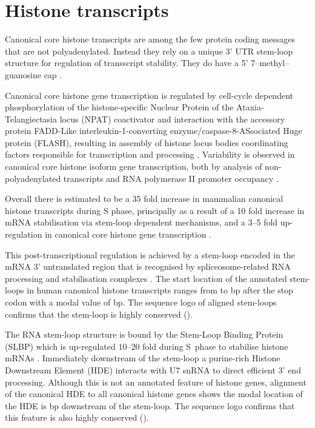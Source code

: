 \section{Histone transcripts}

  Canonical core histone transcripts are among the few protein coding messages that are not polyadenylated.
  Instead they rely on a unique 3' UTR stem-loop structure
  for regulation of transscript stability.
  They do have a 5' 7--methyl--guanosine cap \citep{MarzluffNatRevGen2008}.

  Canonical core histone gene transcription is regulated
  by cell-cycle dependent phosphorylation of the histone-specific
  Nuclear Protein of the Ataxia-Telangiectasia locus (NPAT) coactivator
  and interaction with the accessory protein
  FADD-Like interleukin-1\textbeta{}-converting
  enzyme/caspase-8-ASsociated Huge protein (FLASH),
  resulting in assembly of histone locus bodies
  coordinating factors responsible for transcription and processing
  \citep{MarzluffNatRevGen2008,RattrayMueller2012,Hoefig2014}.
  Variability is observed in canonical core histone isoform gene transcription,
  both by analysis of non-polyadenylated transcripts \citep{YangGenomeBiol2011}
  and RNA polymerase II promoter occupancy \citep{Ederveen2011}.

  Overall there is estimated to be a 35 fold increase in mammalian
  canonical histone transcripts during S phase,
  principally as a result of a 10 fold increase in mRNA stabilisation
  via stem-loop dependent mechanisms,
  and a 3--5 fold up-regulation in canonical core histone gene transcription \citep{HarrisMCB1991}.

  This post-transcriptional regulation is achieved by
  a stem-loop encoded in the mRNA 3' untranslated region
  that is recognised by spliceosome-related RNA
  processing and stabilisation complexes \citep{stem-loop-structure}.
  The start location of the annotated stem-loops in human canonical histone transcripts
  ranges from \StemLoopStartMin{} to \StemLoopStartMax{} bp after the stop codon
  with a modal value of \StemLoopStartMode{} bp.
  The sequence logo of aligned stem-loops confirms that the stem-loop is
  highly conserved ().

  The RNA stem-loop structure is bound by the Stem-Loop Binding Protein (SLBP)
  which is up-regulated 10--20 fold during S~phase to stabilise
  histone mRNAs \citep{SLBP-regulation}.
  Immediately downstream of the stem-loop a purine-rich Histone Downstream Element (HDE)
  interacts with U7 snRNA to direct efficient 3' end processing.
  Although this is not an annotated feature of histone genes,
  alignment of the canonical HDE \citep{HDE-sequence} to all canonical histone genes
  shows the modal location of the HDE is
  \HDEsDistanceFromStemLoopMode{} bp downstream of the stem-loop.
  The sequence logo confirms that this feature is also highly conserved ().

